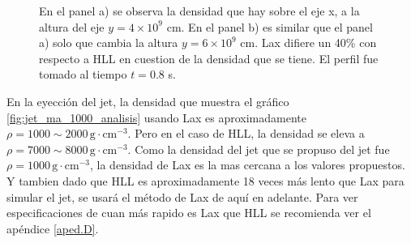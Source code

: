 \documentclass[12pt,a4paper]{book}
\begin{document}
\begin{figure}
\centering
{}
\caption{\label{fig:perfil_densidades_jet}En el panel a) se observa la densidad que hay sobre el eje x, a la altura del eje $y = 4 \times 10^{9}$ cm. En el panel b) es similar que el panel a) solo que cambia la altura $y = 6 \times 10^{9}$ cm. Lax difiere un 40\% con respecto a HLL en cuestion de la densidad que se tiene. El perfil fue tomado al tiempo $t = 0.8$ s.}
\end{figure}

En la eyección del jet, la densidad que muestra el gráfico \ref{fig:jet_ma_1000_analisis} usando Lax es aproximadamente $\rho = 1000 \sim 2000 \, \mathrm{g} \cdot \mathrm{cm}^{-3}$. Pero en el caso de HLL, la densidad se eleva a $\rho = 7000 \sim 8000 \, \mathrm{g} \cdot \mathrm{cm}^{-3}$. Como la densidad del jet que se propuso del jet fue $\rho = 1000 \, \mathrm{g} \cdot \mathrm{cm}^{-3}$, la densidad de Lax es la mas cercana a los valores propuestos. Y tambien dado que HLL es aproximadamente 18 veces más lento que Lax para simular el jet, se usará el método de Lax de aquí en adelante.
 Para ver especificaciones de cuan más rapido es Lax que HLL se recomienda ver el apéndice \ref{aped.D}.
\end{document}
